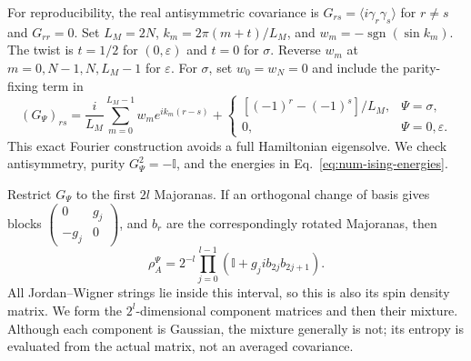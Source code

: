 \documentclass[11pt]{article}
\begin{document}
For reproducibility, the real antisymmetric covariance is
$G_{rs}=\langle i\gamma_r\gamma_s\rangle$ for $r\ne s$ and
$G_{rr}=0$. Set $L_M=2N$, $k_m=2\pi(m+t)/L_M$, and
$w_m=-\operatorname{sgn}(\sin k_m)$. The twist is $t=1/2$
for $(0,\varepsilon)$ and $t=0$ for $\sigma$. Reverse $w_m$
at $m=0,N-1,N,L_M-1$ for $\varepsilon$. For $\sigma$, set
$w_0=w_N=0$ and include the parity-fixing term in
\begin{equation}
 (G_{\Psi})_{rs}=\frac{i}{L_M}\sum_{m=0}^{L_M-1}w_m e^{ik_m(r-s)}
 +\begin{cases}[(-1)^r-(-1)^s]/L_M,&\Psi=\sigma,\\0,&\Psi=0,\varepsilon.
 \end{cases}
 \label{eq:num-covariance}
\end{equation}
This exact Fourier construction avoids a full Hamiltonian
eigensolve. We check antisymmetry, purity $G_{\Psi}^2=-\mathbb{I}$,
and the energies in Eq.~\eqref{eq:num-ising-energies}.

Restrict $G_{\Psi}$ to the first $2l$ Majoranas. If an orthogonal
change of basis gives blocks
$\left(\begin{smallmatrix}0&g_j\\-g_j&0\end{smallmatrix}\right)$,
and $b_r$ are the correspondingly rotated Majoranas, then
\begin{equation}
 \rho_A^\Psi=2^{-l}\prod_{j=0}^{l-1}
       (\mathbb{I}+g_j i b_{2j}b_{2j+1}).
 \label{eq:num-ising-rdm}
\end{equation}
All Jordan--Wigner strings lie inside this interval, so this is
also its spin density matrix. We form the $2^l$-dimensional
component matrices and then their mixture. Although each
component is Gaussian, the mixture generally is not; its
entropy is evaluated from the actual matrix, not an averaged
covariance.
\end{document}

